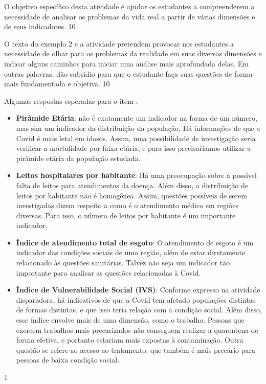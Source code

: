 \begin{objectives}{}
{
  O objetivo específico desta atividade é ajudar os estudantes a compreenderem a necessidade de analisar os problemas da vida real a partir de várias dimensões e de seus indicadores.
}{1}{0}
\end{objectives}
\begin{sugestions}{}
{
  O texto do exemplo 2 e a atividade pretendem provocar nos estudantes a necessidade de olhar para os problemas da realidade em suas diversas dimensões e indicar alguns caminhos para iniciar uma análise mais aprofundada delas. Em outras palavras, dão subsídio para que o estudante faça suas questões de forma mais fundamentada e objetiva.
}{1}{0}
\end{sugestions}
\begin{answer}{}
{
Algumas respostas esperadas para o item :

\begin{itemize}[wide]
\item \textbf{Pirâmide Etária}: não é exatamente um indicador na forma de um número, mas sim um indicador da distribuição da população. Há informações de que a Covid é mais letal em idosos. Assim, uma possibilidade de investigação seria verificar a mortalidade por faixa etária, e para isso precisaŕiamos utilizar a pirâmide etária da população estudada.

\item \textbf{Leitos hospitalares por habitante}: Há uma preocupação sobre a possível falta de leitos para atendimentos da doença. Além disso, a distribuição de leitos por habitante não é homogênea. Assim, questões possíveis de serem investigadas dizem respeito a como é o atendimento médico em regiões diversas. Para isso, o número de leitos por habitante é um importante indicador.

\item \textbf{Índice de atendimento total de esgoto}: O atendimento de esgoto é um indicador das condições sociais de uma região, além de estar diretamente relacionado às questões sanitárias. Talvez não seja um indicador tão importante para analisar as questões relacionadas à Covid.

\item \textbf{Índice de Vulnerabilidade Social (IVS)}: Conforme expresso na atividade disparadora, há indicativos de que a Covid tem afetado populações distintas de formas distintas, e que isso teria relação com a condição social. Além disso, esse índice envolve mais de uma dimensão, como o trabalho. Pessoas que exercem trabalhos mais precarizados não conseguem realizar a quarentena de forma efetiva, e portanto estariam mais expostas à contaminação. Outra questão se refere ao acesso ao tratamento, que também é mais precário para pessoas de baixa condição social.
\end{itemize}
}{1}
\end{answer}


